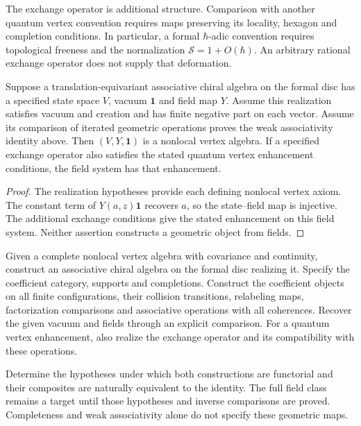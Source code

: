 The exchange operator is additional structure.
Comparison with another quantum vertex convention requires maps preserving its locality, hexagon and completion conditions.
In particular, a formal \(\hbar\)-adic convention requires topological freeness and the normalization \(\mathcal S=1+O(\hbar)\).
An arbitrary rational exchange operator does not supply that deformation.

\begin{recognition}\label{thm:formal-disc}
Suppose a translation-equivariant associative chiral algebra on the formal disc has a specified state space \(V\), vacuum \(\mathbf1\) and field map \(Y\).
Assume this realization satisfies vacuum and creation and has finite negative part on each vector.
Assume its comparison of iterated geometric operations proves the weak associativity identity above.
Then \((V,Y,\mathbf1)\) is a nonlocal vertex algebra.
If a specified exchange operator also satisfies the stated quantum vertex enhancement conditions, the field system has that enhancement.
\end{recognition}
\begin{proof}
The realization hypotheses provide each defining nonlocal vertex axiom.
The constant term of \(Y(a,z)\mathbf1\) recovers \(a\), so the state--field map is injective.
The additional exchange conditions give the stated enhancement on this field system.
Neither assertion constructs a geometric object from fields.
\end{proof}

\begin{problem}
Given a complete nonlocal vertex algebra with covariance and continuity, construct an associative chiral algebra on the formal disc realizing it.
Specify the coefficient category, supports and completions.
Construct the coefficient objects on all finite configurations, their collision transitions, relabeling maps, factorization comparisons and associative operations with all coherences.
Recover the given vacuum and fields through an explicit comparison.
For a quantum vertex enhancement, also realize the exchange operator and its compatibility with these operations.

Determine the hypotheses under which both constructions are functorial and their composites are naturally equivalent to the identity.
The full field class remains a target until those hypotheses and inverse comparisons are proved.
Completeness and weak associativity alone do not specify these geometric maps.
\end{problem}

